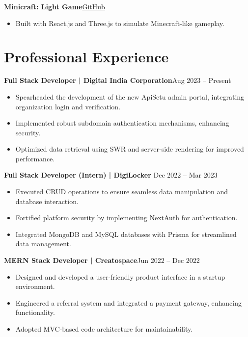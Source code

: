 \documentclass[a4paper,10pt]{article}
\newcommand{\entry}[2]{\textbf{#1}\hfill #2}
\begin{document}
\entry{Minicraft: Light Game}{\href{https://github.com/amanrathore48/Minicraft}{GitHub}}
\begin{itemize}[leftmargin=0.5cm]
    \item Built with React.js and Three.js to simulate Minecraft-like gameplay.
\end{itemize}
\vspace{2pt}

\section*{Professional Experience}
\entry{Full Stack Developer | Digital India Corporation}{Aug 2023 -- Present}
\begin{itemize}[leftmargin=0.5cm]
    \item Spearheaded the development of the new ApiSetu admin portal, integrating organization login and verification.
    \item Implemented robust subdomain authentication mechanisms, enhancing security.
    \item Optimized data retrieval using SWR and server-side rendering for improved performance.
\end{itemize}

\entry{Full Stack Developer (Intern) | DigiLocker}{ Dec 2022 -- Mar 2023}
\begin{itemize}[leftmargin=0.5cm]
    \item Executed CRUD operations to ensure seamless data manipulation and database interaction.
    \item Fortified platform security by implementing NextAuth for authentication.
    \item Integrated MongoDB and MySQL databases with Prisma for streamlined data management.
\end{itemize}

\entry{MERN Stack Developer | Creatospace}{Jun 2022 -- Dec 2022}
\begin{itemize}[leftmargin=0.5cm]
    \item Designed and developed a user-friendly product interface in a startup environment.
    \item Engineered a referral system and integrated a payment gateway, enhancing functionality.
    \item Adopted MVC-based code architecture for maintainability.
\end{itemize}
\vspace{2pt}
\end{document}
